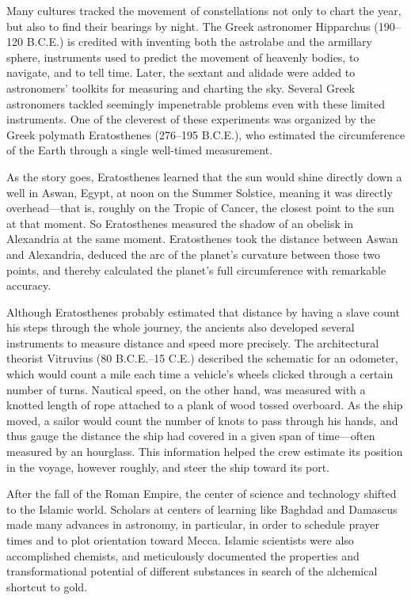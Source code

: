Many cultures tracked the movement of constellations not only to chart the
year, but also to find their bearings by night. The Greek astronomer Hipparchus
(190–120 B.C.E.) is credited with inventing both the astrolabe and
the armillary sphere, instruments used to predict the movement of heavenly
bodies, to navigate, and to tell time. Later, the sextant and alidade were
added to astronomers' toolkits for measuring and charting the sky.
Several Greek astronomers tackled seemingly impenetrable problems even
with these limited instruments. One of the cleverest of these experiments
was organized by the Greek polymath Eratosthenes (276–195 B.C.E.), who estimated the circumference of the Earth through a single well-timed measurement.

As the story goes, Eratosthenes learned that the sun would shine
directly down a well in Aswan, Egypt, at noon on the Summer Solstice,
meaning it was directly overhead—that is, roughly on the Tropic of Cancer,
the closest point to the sun at that moment. So Eratosthenes measured the
shadow of an obelisk in Alexandria at the same moment. Eratosthenes took
the distance between Aswan and Alexandria, deduced the arc of the planet's
curvature between those two points, and thereby calculated the planet's full
circumference with remarkable accuracy.

Although Eratosthenes probably estimated that distance by having a slave
count his steps through the whole journey, the ancients also developed several
instruments to measure distance and speed more precisely. The architectural
theorist Vitruvius (80 B.C.E.–15 C.E.) described the schematic for
an odometer, which would count a mile each time a vehicle's wheels clicked
through a certain number of turns. Nautical speed, on the other hand, was
measured with a knotted length of rope attached to a plank of wood tossed
overboard. As the ship moved, a sailor would count the number of knots to
pass through his hands, and thus gauge the distance the ship had covered
in a given span of time—often measured by an hourglass. This information
helped the crew estimate its position in the voyage, however roughly, and
steer the ship toward its port.

After the fall of the Roman Empire, the center of science and technology
shifted to the Islamic world. Scholars at centers of learning like Baghdad
and Damascus made many advances in astronomy, in particular, in order to
schedule prayer times and to plot orientation toward Mecca. Islamic scientists
were also accomplished chemists, and meticulously documented the
properties and transformational potential of different substances in search
of the alchemical shortcut to gold.

